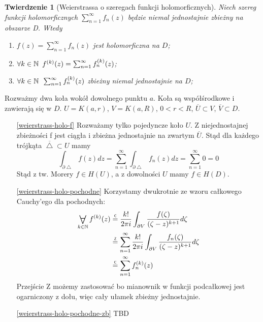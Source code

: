 \documentclass[11pt]{article}
\newcommand{\closure}[1]{\overline{#1}} %
\newcommand{\eqtext}[1]{\overset{\text{\tiny\sffamily #1}}{=}} %
\newcommand{\Forall}[1]{\mathop{\vcenter{\hbox{\LARGE$\forall$}}}\limits_{#1}} %
\theoremstyle{plain}
\newtheorem*{theorem}{Twierdzenie}
\theoremstyle{definition}
\theoremstyle{remark}
\let\oldendproof\endproof
\renewenvironment{proof}[1][\proofname]{
  \oldproof[\textsc{\small #1}]
}{\oldendproof}
\begin{document}
\begin{theorem}[Weierstrassa o szeregach funkcji holomorficznych]
  Niech szereg funkcji holomorficznych $ \sum_{n=1}^{\infty} f_n(z) $ będzie niemal jednostajnie zbieżny na obszarze D. Wtedy

  \begin{enumerate}
    \item $ f(z) = \sum_{n=1}^{\infty} f_n(z) $ jest holomorficzna na $ D $; \label{weierstrass-holo-f}
    \item $ \forall k \in \mathbb{N}\enskip f^{(k)}(z) = \sum_{n=1}^{\infty} f_n^{(k)}(z) $; \label{weierstrass-holo-pochodne}
    \item $ \forall k \in \mathbb{N}\enskip \sum_{n=1}^{\infty} f_n^{(k)}(z) $ zbieżny niemal jednostajnie na $D$; \label{weierstrass-holo-pochodne-zb}
  \end{enumerate}
\end{theorem}

\begin{proof}
  Rozważmy dwa koła wokół dowolnego punktu $a$.
  Koła są współśrodkowe i zawierają się w $D$.
  $ U = K(a, r) $, $ V = K(a, R) $, $ 0 < r < R $, $ \closure{U} \subset V $, $ \closure{V} \subset D $.

  \begin{enumerate}

    \item[\ref{weierstrass-holo-f}]
    Rozważamy tylko pojedyncze koło $U$.
    Z niejednostajnej zbieżności f jest ciągła i zbieżna jednostajnie na zwartym $ \closure{U} $.
    Stąd dla każdego trójkąta $ \closure{\bigtriangleup} \subset U $ mamy
    $$
      \int_{\partial \bigtriangleup} f(z)dz =
      \sum_{n=1}^{\infty}\int_{\partial \bigtriangleup} f_n(z)dz =
      \sum_{n=1}^{\infty} 0 =
      0
    $$
    Stąd z tw. Morery $ f \in H(U) $, a z dowolności $ U $ mamy $ f \in H(D) $.

    \item[\ref{weierstrass-holo-pochodne}]
    Korzystamy dwukrotnie ze wzoru całkowego Cauchy'ego dla pochodnych:
    \begin{align*}
      \Forall{k \in \mathbb{N}} f^{(k)}(z) &
      \eqtext{C} \frac{k!}{2 \pi i} \int_{\partial V} \frac{f(\zeta)}{(\zeta - z)^{k+1}} d\zeta \\ &
      \eqtext{Z} \sum_{n=1}^{\infty} \frac{k!}{2 \pi i} \int_{\partial V} \frac{f_n(\zeta)}{(\zeta - z)^{k+1}} d\zeta \\ &
      \eqtext{C} \sum_{n=1}^{\infty} f_n^{(k)}(z)
    \end{align*}
    Przejście Z możemy zastosować bo mianownik w funkcji podcałkowej jest ogarniczony z dołu, więc cały ułamek zbieżny jednostajnie.

    \item[\ref{weierstrass-holo-pochodne-zb}]
    TBD
  \end{enumerate}  
\end{proof}
\end{document}
